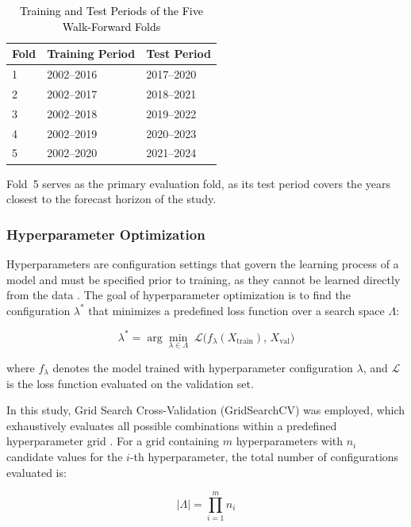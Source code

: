 \documentclass[final, 9pt, twocolumn]{saucis}
\newcommand{\rev}[1]{\textcolor{black}{#1}}
\begin{document}
\begin{table}[htbp]
\centering
\caption{\rev{Training and Test Periods of the Five Walk-Forward Folds}}
\label{tab:kfold}
\small
\begin{tabular}{p{1.5cm} p{3cm} p{3cm}}
\hline
\textbf{Fold} & \textbf{Training Period} & \textbf{Test Period} \\
\hline
1 & 2002--2016 & 2017--2020 \\
2 & 2002--2017 & 2018--2021 \\
3 & 2002--2018 & 2019--2022 \\
4 & 2002--2019 & 2020--2023 \\
5 & 2002--2020 & 2021--2024 \\
\hline
\end{tabular}
\end{table}

Fold~5 serves as the primary evaluation fold, as its test period 
covers the years closest to the forecast horizon of the study.

\subsubsection{Hyperparameter Optimization}

Hyperparameters are configuration settings that govern the learning 
process of a model and must be specified prior to training, as they cannot be learned directly from the data \cite{methodnew5}. The goal of hyperparameter optimization is to find the configuration $\lambda^{*}$ that minimizes a predefined loss function over a search space $\Lambda$:

\begin{equation}
    \lambda^{*} = \arg\min_{\lambda \in \Lambda} \; 
    \mathcal{L}\bigl(f_{\lambda}(X_{\text{train}}),\, X_{\text{val}}\bigr)
\end{equation}

where $f_{\lambda}$ denotes the model trained with hyperparameter 
configuration $\lambda$, and $\mathcal{L}$ is the loss function 
evaluated on the validation set.

In this study, Grid Search Cross-Validation (GridSearchCV) was 
employed, which exhaustively evaluates all possible combinations 
within a predefined hyperparameter grid \cite{methodnew6}. For a 
grid containing $m$ hyperparameters with $n_i$ candidate values 
for the $i$-th hyperparameter, the total number of configurations 
evaluated is:

\begin{equation}
    |\Lambda| = \prod_{i=1}^{m} n_i
\end{equation}
\end{document}
